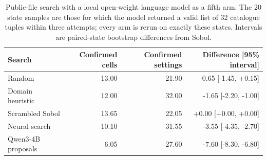\begin{table}[htbp]
\centering\small
\caption{Public-file search with a local open-weight language model as a fifth arm. The 20 state samples are those for which the model returned a valid list of 32 catalogue tuples within three attempts; every arm is rerun on exactly these states. Intervals are paired-state bootstrap differences from Sobol.}
\label{tab:public-search-llm}
\begin{tabular}{lrrr}
\toprule
Search & Confirmed cells & Confirmed settings & Difference [95\% interval] \\
\midrule
Random & 13.00 & 21.90 & -0.65 [-1.45, +0.15] \\
Domain heuristic & 12.00 & 32.00 & -1.65 [-2.20, -1.00] \\
Scrambled Sobol & 13.65 & 22.05 & +0.00 [+0.00, +0.00] \\
Neural search & 10.10 & 31.55 & -3.55 [-4.35, -2.70] \\
Qwen3-4B proposals & 6.05 & 27.60 & -7.60 [-8.30, -6.80] \\
\bottomrule
\end{tabular}
\end{table}
